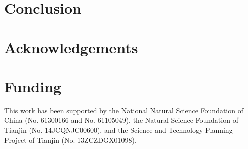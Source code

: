 \documentclass{bioinfo}
\begin{document}
\section{Conclusion}

\section*{Acknowledgements}

\section*{Funding}
This work has been supported by the National Natural Science Foundation of China (No. 61300166 and No. 61105049),
the Natural Science Foundation of Tianjin (No. 14JCQNJC00600), and the Science and Technology Planning
Project of Tianjin (No. 13ZCZDGX01098).

%
%
%
%
%
%
%
%
%
%
%
%
%

%
\end{document}

